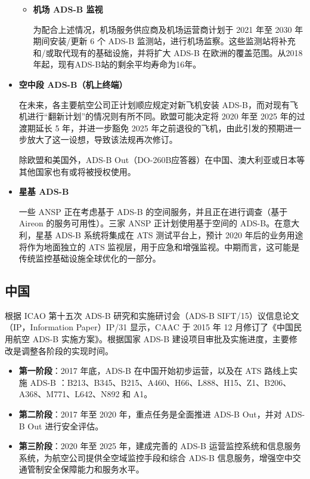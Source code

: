 \begin{itemize}
\begin{itemize}
        \item \textbf{机场 ADS-B 监视}

        为配合上述情况，机场服务供应商及机场运营商计划于 2021 年至 2030 年期间安装/更新 6 个 ADS-B 监测站，进行机场监察。这些监测站将补充和/或取代现有的基础设施，并将扩大 ADS-B 在欧洲的覆盖范围。从2018年起，现有ADS-B站的剩余平均寿命为16年。
    \end{itemize}

    \item \textbf{空中段 ADS-B（机上终端）}

    在未来，各主要航空公司正计划顺应规定对新飞机安装 ADS-B，而对现有飞机进行“翻新计划”的情况则有所不同。欧盟可能决定将 2020 年至 2025 年的过渡期延长 5 年，并进一步豁免 2025 年之前退役的飞机，由此引发的预期进一步放大了这一设想，导致该法规再次修订。

    除欧盟和美国外，ADS-B Out（DO-260B应答器）在中国、澳大利亚或日本等其他国家也有或将被授权使用。

    \item \textbf{星基 ADS-B}

    一些 ANSP 正在考虑基于 ADS-B 的空间服务，并且正在进行调查（基于 Aireon 的服务可用性）。三家 ANSP 正计划使用基于空间的 ADS-B。在意大利，星基 ADS-B 系统将集成在 ATS 测试平台上，预计 2020 年后的业务用途将作为地面独立的 ATS 监视层，用于应急和增强监视。中期而言，这可能是传统监控基础设施全球优化的一部分。

\end{itemize}

\subsection{中国}

根据 ICAO 第十五次 ADS-B 研究和实施研讨会（ADS-B SIFT/15）议信息论文（IP，Information Paper）IP/31 显示，CAAC 于 2015 年 12 月修订了《中国民用航空 ADS-B 实施方案》。根据国家 ADS-B 建设项目审批及实施进度，主要修改是调整各阶段的实现时间。

\begin{itemize}
    \item \textbf{第一阶段}：2017 年底，ADS-B 在中国开始初步运营，以及在 ATS 路线上实施 ADS-B ：B213、B345、B215、A460、H66、L888、H15、Z1、B206、A368、M771、L642、N892 和 A1。

    \item \textbf{第二阶段}：2017 年至 2020 年，重点任务是全面推进 ADS-B Out，并对 ADS-B Out 进行安全评估。

    \item \textbf{第三阶段}：2020 年至 2025 年，建成完善的 ADS-B 运营监控系统和信息服务系统，为航空公司提供全空域监控手段和综合 ADS-B 信息服务，增强空中交通管制安全保障能力和服务水平。
\end{itemize}

